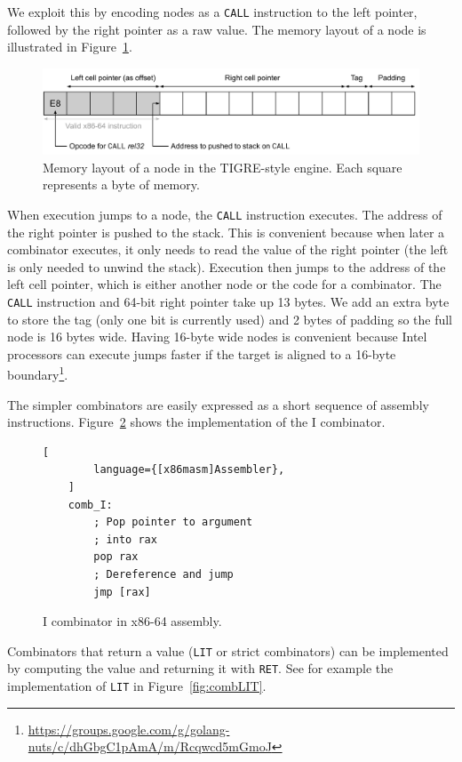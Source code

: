 \documentclass[conference]{IEEEtran}
\begin{document}
We exploit this by encoding nodes as a \texttt{CALL} instruction to the left pointer, followed by the right pointer as a raw value.
The memory layout of a node is illustrated in Figure~\ref{fig:tigre_layout}.

\begin{figure}
    \includegraphics[width=2\columnwidth]{tigre_layout}
    \centering
    \caption{
        Memory layout of a node in the TIGRE-style engine.
        Each square represents a byte of memory.
    }
    \label{fig:tigre_layout}
\end{figure}

When execution jumps to a node, the \texttt{CALL} instruction executes.
The address of the right pointer is pushed to the stack.
This is convenient because when later a combinator executes, it only needs to read the value of the right pointer (the left is only needed to unwind the stack).
Execution then jumps to the address of the left cell pointer, which is either another node or the code for a combinator.
The \texttt{CALL} instruction and 64-bit right pointer take up 13 bytes.
We add an extra byte to store the tag (only one bit is currently used) and 2 bytes of padding so the full node is 16 bytes wide.
Having 16-byte wide nodes is convenient because Intel processors can execute jumps faster if the target is aligned to a 16-byte boundary\footnote{\url{https://groups.google.com/g/golang-nuts/c/dhGbgC1pAmA/m/Rcqwcd5mGmoJ}}.

The simpler combinators are easily expressed as a short sequence of assembly instructions.
Figure~\ref{fig:combI} shows the implementation of the I combinator.

\begin{figure}
    \begin{lstlisting}[
        language={[x86masm]Assembler},
    ]
    comb_I:
        ; Pop pointer to argument
        ; into rax
        pop rax
        ; Dereference and jump
        jmp [rax]
    \end{lstlisting}
    \centering
    \caption{I combinator in x86-64 assembly.}
    \label{fig:combI}
\end{figure}

Combinators that return a value (\texttt{LIT} or strict combinators) can be implemented by computing the value and returning it with \texttt{RET}.
See for example the implementation of \texttt{LIT} in Figure~\ref{fig:combLIT}.
\end{document}
